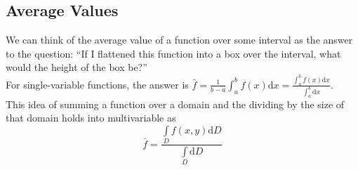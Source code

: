 \subsection{Average Values}
\noindent
We can think of the average value of a function over some interval as the answer to the question: “If I flattened this function into a box over the interval, what would the height of the box be?”\\
For single-variable functions, the answer is $\bar{f}=\frac{1}{b-a}\int_{a}^{b}{f(x)\mathrm{d}x}=\frac{\int_{a}^{b}{f(x)\mathrm{d}x}}{\int_{a}^{b}{\mathrm{d}x}}$.\\
This idea of summing a function over a domain and the dividing by the size of that domain holds into multivariable as
$$\bar{f}=\frac{\int\limits_{D}{f(x,y)\mathrm{d}D}}{\int\limits_{D}{\mathrm{d}D}}$$


